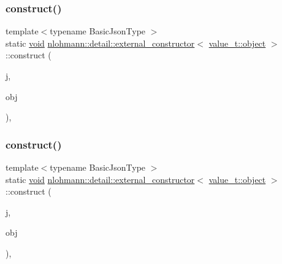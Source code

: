 \subsubsection{\texorpdfstring{construct()}{construct()}\hspace{0.1cm}{\footnotesize\ttfamily [1/3]}}
{\footnotesize\ttfamily template$<$typename Basic\+Json\+Type $>$ \\
static \hyperlink{namespacenlohmann_1_1detail_a59fca69799f6b9e366710cb9043aa77d}{void} \hyperlink{structnlohmann_1_1detail_1_1external__constructor}{nlohmann\+::detail\+::external\+\_\+constructor}$<$ \hyperlink{namespacenlohmann_1_1detail_a1ed8fc6239da25abcaf681d30ace4985aa8cfde6331bd59eb2ac96f8911c4b666}{value\+\_\+t\+::object} $>$\+::construct (\begin{DoxyParamCaption}\item[{Basic\+Json\+Type \&}]{j,  }\item[{const typename Basic\+Json\+Type\+::object\+\_\+t \&}]{obj }\end{DoxyParamCaption})\hspace{0.3cm}{\ttfamily [inline]}, {\ttfamily [static]}}

\mbox{\label{structnlohmann_1_1detail_1_1external__constructor_3_01value__t_1_1object_01_4_a1e044961affbd6417386d6e9f1d545e9}} 
\subsubsection{\texorpdfstring{construct()}{construct()}\hspace{0.1cm}{\footnotesize\ttfamily [2/3]}}
{\footnotesize\ttfamily template$<$typename Basic\+Json\+Type $>$ \\
static \hyperlink{namespacenlohmann_1_1detail_a59fca69799f6b9e366710cb9043aa77d}{void} \hyperlink{structnlohmann_1_1detail_1_1external__constructor}{nlohmann\+::detail\+::external\+\_\+constructor}$<$ \hyperlink{namespacenlohmann_1_1detail_a1ed8fc6239da25abcaf681d30ace4985aa8cfde6331bd59eb2ac96f8911c4b666}{value\+\_\+t\+::object} $>$\+::construct (\begin{DoxyParamCaption}\item[{Basic\+Json\+Type \&}]{j,  }\item[{typename Basic\+Json\+Type\+::object\+\_\+t \&\&}]{obj }\end{DoxyParamCaption})\hspace{0.3cm}{\ttfamily [inline]}, {\ttfamily [static]}}

